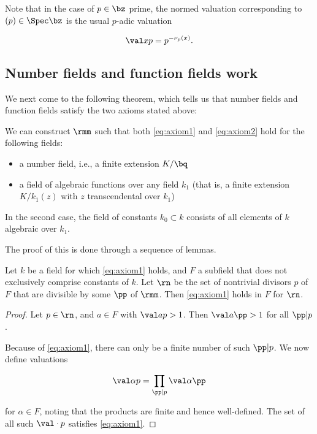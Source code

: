 Note that in the case of $p\in\bz$ prime, the normed valuation corresponding to
$(p)\in\Spec\bz$ is the usual $p$-adic valuation

\[ \val x p = p^{-\nu_p(x)}. \]

\subsection{Number fields and function fields work}
We next come to the following theorem, which tells us that number fields and
function fields satisfy the two axioms stated above:

\begin{thm}
  \label{thm:works}
  We can construct $\rmm$ such that both \ref{eq:axiom1} and \ref{eq:axiom2} hold
  for the following fields:
  \begin{itemize}
  \item a number field, i.e., a finite extension $K/\bq$
  \item a field of algebraic functions over any field $k_1$ (that is, a finite
    extension $K/k_1(z)$ with $z$ transcendental over $k_1$)
  \end{itemize}
  In the second case, the field of constants $k_0 \subset k$ consists of all
  elements of $k$ algebraic over $k_1$.
\end{thm}

The proof of this is done through a sequence of lemmas.

\begin{lemma}
  Let $k$ be a field for which \ref{eq:axiom1} holds, and $F$ a subfield that
  does not exclusively comprise constants of $k$. Let $\rn$ be the set of
  nontrivial divisors $p$ of $F$ that are divisible by some $\pp$ of $\rmm$.
  Then \ref{eq:axiom1} holds in $F$ for $\rn$.
\end{lemma}

\begin{proof}
  Let $p \in\rn$, and $a\in F$ with $\val a p > 1$. Then $\val a \pp > 1$ for all
  $\pp|p$.

  Because of \ref{eq:axiom1}, there can only be a finite number of such
  $\pp|p$. We now define valuations

  \[ \val \alpha p = \prod_{\pp|p} \val \alpha \pp \]

  for $\alpha\in F$, noting that the products are finite and hence well-defined.
  The set of all such $\val \cdot p$ satisfies \ref{eq:axiom1}.
\end{proof}

